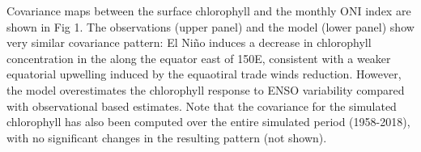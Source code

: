 Covariance maps between the surface chlorophyll and the monthly ONI index are shown in Fig 1. The observations (upper panel) and the model (lower panel) show very similar covariance pattern: El Niño induces a decrease in chlorophyll concentration in the along the equator east of 150\degree{}E, consistent with a weaker equatorial upwelling induced by the equaotiral trade winds reduction. However, the model overestimates the chlorophyll response to ENSO variability compared with observational based estimates. Note that the covariance for the simulated chlorophyll has also been computed over the entire simulated period (1958-2018), with no significant changes in the resulting pattern (not shown).